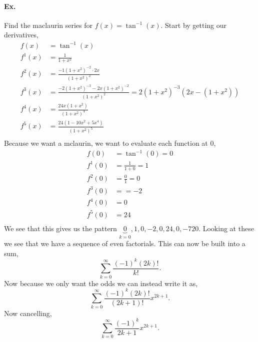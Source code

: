 	\paragraph{Ex.}
	Find the maclaurin series for $ f\left( x \right) = \tan^{ -1 } \left( x \right)  $. Start by getting our derivatives,
	\begin{align*}
		f\left( x \right) &= \tan^{ -1 } \left( x \right) \\
		f^{ 1 }\left( x \right) &= \frac{ 1 }{ 1+x^2 } \\
		f^{ 2 }\left( x \right) &= \frac{ -1\left( 1+x^2 \right) ^{ -2 }\cdot 2x }{ \left( 1+x^2 \right) ^2 } \\
		f^{ 3 }\left( x \right) &= \frac{ -2\left( 1+x^2 \right)^{ -3 } -2x\left( 1+x^2 \right)^{ -2 }  }{ \left( 1+x^2 \right) ^2 } = 2\left( 1+x^2 \right) ^{ -3 }\left( 2x-\left( 1+x^2 \right) \right) \\
		f^{ 4 }\left( x \right) &=  \frac{ 24x\left( 1+x^2 \right)  }{ \left( 1+x^2 \right) ^{ 4 } }  \\
		f^{ 5 }\left( x \right) &= \frac{ 24\left( 1-10x^2+5x^{ 4 } \right)  }{ \left( 1+x^2 \right) ^{ 5 } } \\
	\end{align*}
	Because we want a mclaurin, we want to evaluate each function at 0,
	\begin{align*}
		f\left( 0 \right) &= \tan^{ -1 } \left( 0 \right) = 0 \\
		f^{ 1 }\left( 0 \right) &= \frac{ 1 }{ 1+0 } = 1 \\
		f^{ 2 }\left( 0 \right) &= \frac{ 0 }{ 1 } = 0 \\
		f^{ 3 }\left( 0 \right) &= = -2 \\
		f^{ 4 }\left( 0 \right) &= 0 \\
		f^{ 5 }\left( 0 \right) &= 24 \\
	\end{align*}
	We see that this gives us the pattern $ \underbrace{ 0 }_{ k=0 } ,1,0,-2,0,24,0,-720 $. Looking at these we see that we have a sequence of even factorials. This can now be built into a sum,
	\[
	\sum_{ k=0 } ^{ \infty } \frac{ \left( -1 \right) ^{ k }\left( 2k \right) ! }{ k! }
	.\] 
	Now because we only want the odds we can instead write it as,
	\[
	\sum_{ k=0 } ^{ \infty } \frac{ \left( -1 \right) ^{ k }\left( 2k \right) ! }{ \left(2k+1\right)! }x^{ 2k+1 }
	.\] 
	Now cancelling,
	\[
	\sum_{ k=0 } ^{ \infty } \frac{ \left( -1 \right) ^{ k } }{ 2k+1 }x^{ 2k+1 }
	.\] 
